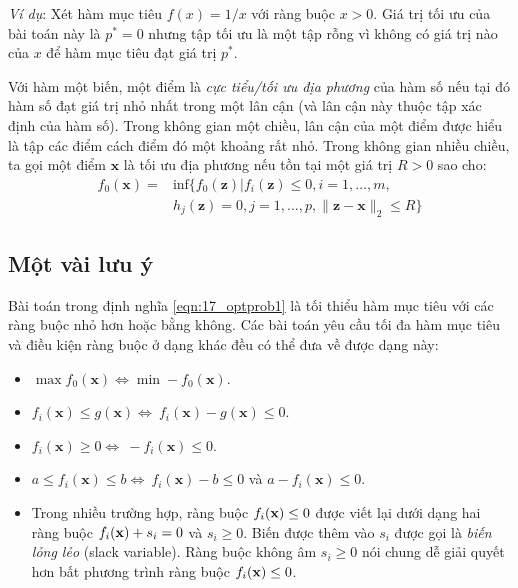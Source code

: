 \textit{Ví dụ}: Xét hàm mục tiêu $f(x) = 1/x$ với ràng buộc $x > 0$. Giá trị tối ưu của bài toán này là $p^* = 0$ nhưng tập tối ưu là một tập rỗng
vì không có giá trị nào của $x$ để hàm mục tiêu đạt giá trị $p^*$.

Với hàm một biến, một điểm là \textit{cực tiểu/tối ưu địa phương} của hàm số nếu tại đó hàm số
đạt giá trị nhỏ nhất trong một lân cận (và lân cận này thuộc tập xác định của
hàm số). Trong không gian một chiều, {lân cận} của một điểm được hiểu là
tập các điểm cách điểm đó một khoảng rất nhỏ. Trong không gian nhiều chiều, ta
gọi một điểm $\mathbf{x}$ là {tối ưu địa phương} nếu tồn tại một
giá trị $R > 0$ sao cho:
\begin{eqnarray}
\nonumber
f_0(\mathbf{x}) = &\text{inf}\big\{f_0(\mathbf{z}) | f_i(\mathbf{z}) \leq 0, i = 1, \dots, m, \\
& h_j(\mathbf{z}) = 0, j = 1, \dots, p, \|\mathbf{z} - \mathbf{x}\|_2 \leq R\big\}
\end{eqnarray}


\subsection{Một vài lưu ý}
Bài toán trong định nghĩa \eqref{eqn:17_optprob1} là {tối thiểu hàm mục tiêu} với các ràng buộc nhỏ hơn
hoặc bằng không. Các bài toán yêu cầu {tối đa hàm mục tiêu} và điều kiện
ràng buộc ở dạng khác đều có thể đưa về được dạng này:
\begin{itemize}
\item $\max f_0(\mathbf{x}) \Leftrightarrow\min -f_0(\mathbf{x}) $.

\item $f_i(\mathbf{x}) \leq g(\mathbf{x}) \Leftrightarrow\ f_i(\mathbf{x}) - g(\mathbf{x}) \leq 0$.

\item $f_i(\mathbf{x}) \geq 0 \Leftrightarrow\ -f_i(\mathbf{x}) \leq 0 $.

\item $a \leq f_i(\mathbf{x}) \leq b \Leftrightarrow\ f_i(\mathbf{x}) -b \leq 0$ và $a - f_i(\mathbf{x}) \leq 0$.
\item Trong nhiều trường hợp, ràng buộc $f_i(\mathbf{x}) \leq 0$ được viết lại dưới dạng hai ràng buộc $f_i(\mathbf{x}) + s_i = 0$ và $s_i \geq 0$. Biến được thêm vào $s_i$ được gọi là \textit{biến lỏng lẻo} (slack variable).
Ràng buộc không âm $s_i \geq 0$ nói chung dễ giải quyết hơn bất phương trình ràng buộc $f_i(\mathbf{x}) \leq 0$.
\end{itemize}

